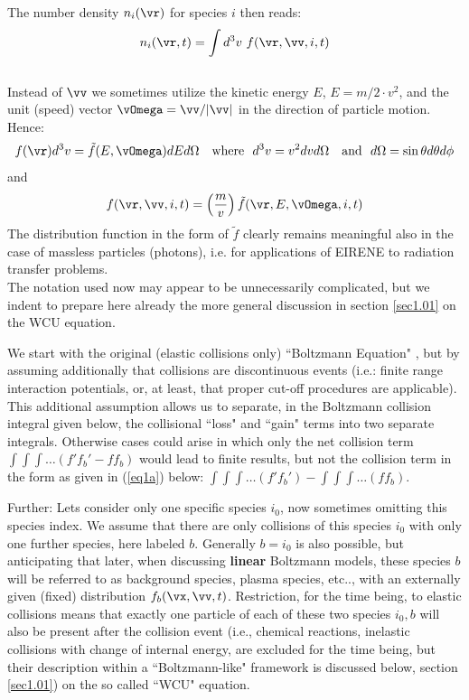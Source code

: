 The number density $n_i(\vr)$ for species $i$ then
reads:
\[
n_i(\vr,t) = \int d^3{v} \ f(\vr,\vv,i,t)
\]
\\
Instead of $\vv$ we sometimes utilize the kinetic energy
$E$, $E=m/2 \cdot v^2$, and the unit (speed) vector
$\vOmega = \vv/|\vv|$ in the
direction of particle motion. Hence:
\begin{equation}\nonumber
f(\vr)d^3v = \tilde f(E, \vOmega)dEd\Omega \quad \mbox{where}  ~~d^3v = v^2dv d\Omega \quad \mbox{and} ~~ d\Omega = \sin \theta d\theta d\phi
\end{equation}
and
\[
f(\vr, \vv, i ,t)   = \left(\frac{m}{v}\right)
\tilde{f}(\vr, E, \vOmega, i, t)
\]
The distribution function in the form of $\tilde f$ clearly remains meaningful also in the case of massless particles (photons),
i.e. for applications of EIRENE to radiation transfer problems.
\\
The notation used now may appear to be unnecessarily complicated, but we indent to prepare here already the
more general discussion in section \ref{sec1.01} on the WCU equation.

We start with the original (elastic collisions only) ``Boltzmann Equation" \cite{kn:Cercignani},
but by assuming additionally that collisions are discontinuous events (i.e.: finite range
interaction potentials, or, at least, that proper cut-off procedures are applicable).
This additional assumption allows us to separate, in the Boltzmann collision integral
given below, the collisional ``loss" and ``gain" terms into two
separate integrals. Otherwise cases could arise in which only the net collision term $\int\!\!\int\!\!\int \dots (f'f_b'-ff_b)$ would lead to finite results,
but not the collision term in the form as given in (\ref{eq1a}) below: $\int\!\!\int\!\!\int \dots (f'f_b')- \int\!\!\int\!\!\int \dots (ff_b)$.

Further: Lets consider only one specific species $i_0$, now sometimes
omitting this species index. We assume that there are only
collisions of this species $i_0$ with only one further species, here
labeled $b$. Generally $b=i_0$ is also possible, but anticipating that later, when discussing \textbf{linear} Boltzmann models,
these species $b$ will be referred to as background species, plasma species, etc.., with an externally given (fixed) distribution $f_b(\vx,\vv,t)$.
Restriction, for the time being, to elastic collisions means that exactly one particle of each of these two
species $i_0, b$ will also be present after the collision event (i.e.,
chemical reactions, inelastic collisions with change of internal energy,
are excluded for the time being,
but their description within a ``Boltzmann-like" framework is discussed below,
section \ref{sec1.01}) on the so called ``WCU" equation.

